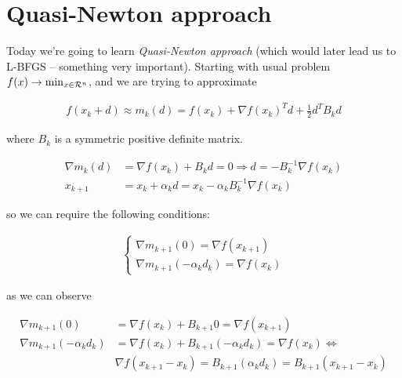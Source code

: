 \section{Quasi-Newton approach}

Today we're going to learn \emph{Quasi-Newton approach} (which would later lead us to L-BFGS -- something very important). Starting with usual problem $f(x) \to \min_{x \in \mathcal{R}^n}$, and we are trying to approximate 

\begin{equation*}
    \begin{aligned}
        f(x_k + d) \approx m_k(d) = f(x_k) + \nabla f(x_k)^T d + \frac{1}{2} d^T B_k d
    \end{aligned}
\end{equation*}

where $B_k$ is a symmetric positive definite matrix. 

\begin{equation*}
    \begin{aligned}
        \nabla m_k(d) &= \nabla f(x_k) + B_k d = 0 \Rightarrow d = -B_k^{-1} \nabla f(x_k) \\ 
        x_{k+1} &= x_k + \alpha_k d = x_k - \alpha_k B_k^{-1} \nabla f(x_k)
    \end{aligned}
\end{equation*}

so we can require the following conditions:

\begin{conj}
    \begin{equation*}
        \begin{aligned}
            \begin{cases}
                \nabla m_{k+1}(0) = \nabla f(x_{k+1}) \\ 
                \nabla m_{k+1}(-\alpha_k d_k) = \nabla f(x_k)
            \end{cases}
        \end{aligned}
    \end{equation*}
\end{conj}

as we can observe

\begin{equation*}
    \begin{aligned}
        \nabla m_{k+1}(0) &= \nabla f(x_k) + B_{k+1} 0 = \nabla f(x_{k+1}) \\
        \nabla m_{k+1}(-\alpha_k d_k) &= \nabla f(x_k) + B_{k+1} (-\alpha_k d_k) = \nabla f(x_k) \Leftrightarrow \\ 
        &\nabla f(x_{k+1} - x_k) = B_{k+1}(\alpha_k d_k) = B_{k+1} (x_{k+1} - x_k) 
    \end{aligned}
\end{equation*}

